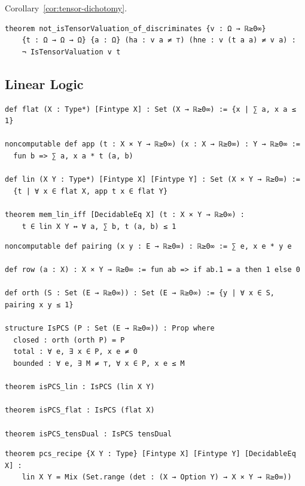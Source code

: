 \noindent Corollary~\ref{cor:tensor-dichotomy}.

\label{lean:tensor-dichotomy}
\begin{lstlisting}
theorem not_isTensorValuation_of_discriminates {v : Ω → ℝ≥0∞}
    {t : Ω → Ω → Ω} {a : Ω} (ha : v a ≠ ⊤) (hne : v (t a a) ≠ v a) :
    ¬ IsTensorValuation v t
\end{lstlisting}

\subsection{Linear Logic}

\label{lean:mem-lin-iff}
\begin{lstlisting}
def flat (X : Type*) [Fintype X] : Set (X → ℝ≥0∞) := {x | ∑ a, x a ≤ 1}

noncomputable def app (t : X × Y → ℝ≥0∞) (x : X → ℝ≥0∞) : Y → ℝ≥0∞ :=
  fun b => ∑ a, x a * t (a, b)

def lin (X Y : Type*) [Fintype X] [Fintype Y] : Set (X × Y → ℝ≥0∞) :=
  {t | ∀ x ∈ flat X, app t x ∈ flat Y}

theorem mem_lin_iff [DecidableEq X] (t : X × Y → ℝ≥0∞) :
    t ∈ lin X Y ↔ ∀ a, ∑ b, t (a, b) ≤ 1
\end{lstlisting}

\label{lean:ispcs-lin}
\begin{lstlisting}
noncomputable def pairing (x y : E → ℝ≥0∞) : ℝ≥0∞ := ∑ e, x e * y e

def row (a : X) : X × Y → ℝ≥0∞ := fun ab => if ab.1 = a then 1 else 0

def orth (S : Set (E → ℝ≥0∞)) : Set (E → ℝ≥0∞) := {y | ∀ x ∈ S, pairing x y ≤ 1}

structure IsPCS (P : Set (E → ℝ≥0∞)) : Prop where
  closed : orth (orth P) = P
  total : ∀ e, ∃ x ∈ P, x e ≠ 0
  bounded : ∀ e, ∃ M ≠ ⊤, ∀ x ∈ P, x e ≤ M

theorem isPCS_lin : IsPCS (lin X Y)

theorem isPCS_flat : IsPCS (flat X)

theorem isPCS_tensDual : IsPCS tensDual
\end{lstlisting}

\label{lean:pcs-recipe}
\begin{lstlisting}
theorem pcs_recipe {X Y : Type} [Fintype X] [Fintype Y] [DecidableEq X] :
    lin X Y = Mix (Set.range (det : (X → Option Y) → X × Y → ℝ≥0∞))
\end{lstlisting}

